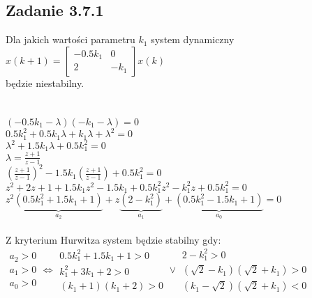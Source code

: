 \subsection*{Zadanie 3.7.1} {\color{darkgray}
	Dla jakich wartości parametru $k_1$ system dynamiczny\\
	$x(k+1)=\left[ \begin{array}{cc}     -0.5k_1&0\\2&-k_1    \end{array}\right]x(k)$\\
	będzie niestabilny.\\
}\lineh
\\\\
$(-0.5k_1-\lambda)(-k_1-\lambda)=0$\\
$0.5k_1^2+0.5k_1\lambda+k_1\lambda+\lambda^2=0$\\
$\lambda^2+1.5k_1\lambda+0.5k_1^2=0$\\
$\lambda=\frac{z+1}{z-1}$\\
$(\frac{z+1}{z-1})^2-1.5k_1(\frac{z+1}{z-1})+0.5k_1^2=0$\\
$z^2+2z+1+1.5k_1z^2-1.5k_1+0.5k_1^2z^2-k_1^2z+0.5k_1^2=0$\\
$z^2\underbrace{(0.5k_1^2+1.5k_1+1)}_{a_2}+z\underbrace{(2-k_1^2)}_{a_1}+\underbrace{(0.5k_1^2-1.5k_1+1)}_{a_0}=0$\\\\
Z kryterium Hurwitza system będzie stabilny gdy:\\
 $\begin{array}{c}   a_2>0 \\ a_1>0 \\ a_0>0    \end{array} 
\Leftrightarrow  \begin{array}{r} 
	0.5k_1^2+1.5k_1+1>0 \\ 
	k_1^2+3k_1+2>0 \\
 	(k_1+1)(k_1+2)>0 
\end{array}   
\vee \begin{array}{r}
	2-k_1^2>0 \\
	(\sqrt{2}-k_1)(\sqrt{2}+k_1)>0\\
	(k_1-\sqrt{2})(\sqrt{2}+k_1)<0
\end{array}$
